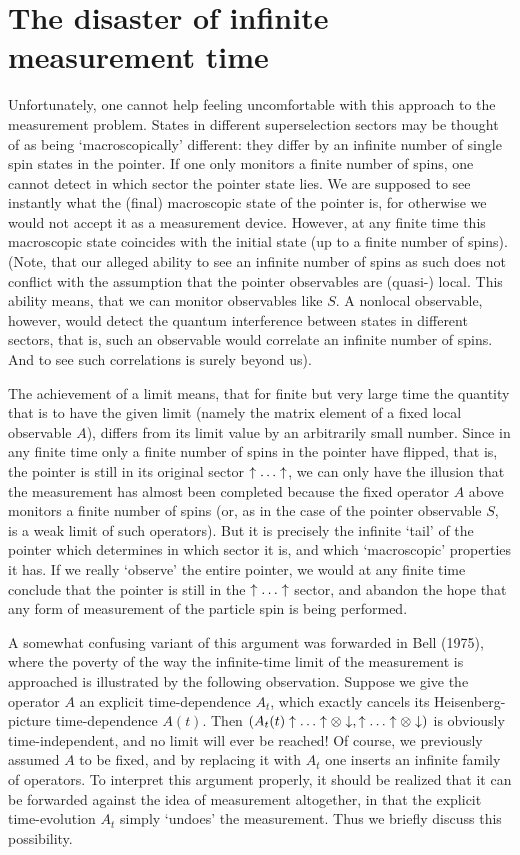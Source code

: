 \section{The disaster of infinite measurement time}
 Unfortunately, one cannot help feeling
uncomfortable with this approach to the measurement problem.
States in different superselection sectors may be thought of as being
`macroscopically' different:
they differ by an infinite number of  single spin states in the pointer. If one
only monitors a
finite number of spins, one cannot detect in which sector the pointer state
lies. We are supposed
to see instantly what the (final) macroscopic state of the pointer is, for
otherwise we would not
accept it as a measurement device.
However, at any finite time this macroscopic state coincides with the initial
state (up to a finite
number of spins). (Note, that  our
alleged ability to see an infinite number of spins as such does not conflict
with the assumption that
the pointer observables are (quasi-) local.  This ability means, that we can
monitor observables like
$S$. A nonlocal observable, however, would detect the quantum interference
between states in different
sectors, that is, such an observable would correlate an infinite number of
spins. And to see such
correlations is surely beyond us).


The achievement of a limit means, that for finite but very large time the
quantity that is to have
the given limit (namely the matrix element of a fixed local observable $A$),
differs from its limit
value by an arbitrarily small number. Since in any finite time only a finite
number of spins in the
pointer have flipped, that is, the pointer is still in its original sector
$\uparrow\ldots\uparrow$, we can only have the
illusion that the measurement has almost been completed because the fixed
operator $A$ above monitors
a finite number of spins (or, as in the case of the pointer observable $S$,  is
a weak limit of such
operators). But it is precisely the infinite `tail' of the pointer which
determines in which sector it
is, and which `macroscopic' properties it has. If we really `observe' the
entire pointer, we would at
any finite time conclude that the pointer is still in the $\uparrow\ldots\uparrow$ sector, and
abandon the hope that any
form of measurement of the particle spin is being performed.

A somewhat confusing variant of  this argument  was forwarded in  Bell (1975),
where the poverty of the way the infinite-time limit of the measurement is
approached is illustrated
by the following observation. Suppose we give the operator $A$ an explicit
time-dependence $A_t$,
which exactly cancels its Heisenberg-picture time-dependence $A(t)$. Then
$(A_t(t)\uparrow\ldots\uparrow\otimes\downarrow,\uparrow\ldots\uparrow\otimes\downarrow)$
 is obviously time-independent, and no limit will ever be reached! Of course,
we
previously assumed $A$ to be fixed, and by replacing it with $A_t$ one inserts
an infinite
family  of operators. To interpret this argument properly, it should be
realized
that it can be forwarded against the idea  of measurement altogether, in that
the
explicit time-evolution $A_t$ simply `undoes' the measurement. Thus we briefly
discuss
this possibility.

